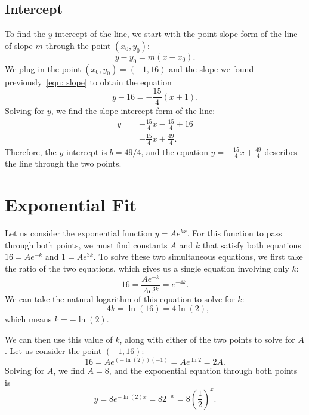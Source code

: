 \documentclass[10pt]{article}         %
\begin{document}
\subsection{Intercept}
\label{sec: intercept}

To find the $y$-intercept of the line, we start with the point-slope form of
the line of slope $m$ through the point $(x_0, y_0)$:
$$
	y - y_0 = m (x - x_0)
	.
$$
We plug in the point $(x_0, y_0) = (-1, 16)$ and the slope we found
previously~\eqref{eqn: slope} to obtain the equation
$$
	y - 16 = - \frac{15}{4} (x + 1)
	.
$$
Solving for $y$, we find the slope-intercept form of the line:
\begin{align*}
	y 
	&= - \frac{15}{4} x - \frac{15}{4} + 16 \\
	&= - \frac{15}{4} x + \frac{49}{4}
	.
\end{align*}
Therefore, the $y$-intercept is $b = 49/4$, and the equation 
$y = - \frac{15}{4} x + \frac{49}{4}$ describes the line through the two
points.

\section{Exponential Fit}
\label{sec: exponential fit}

Let us consider the exponential function $y = A e^{k x}$.  For this function
to pass through both points, we must find constants $A$ and $k$ that satisfy
both equations $16 = A e^{-k}$ and $1 = A e^{3 k}$.  To solve these two
simultaneous equations, we first take the ratio of the two equations, which
gives us a single equation involving only $k$:
$$
	16
	= \frac{A e^{-k}}{A e^{3 k}}
	= e^{-4 k}
	.
$$
We can take the natural logarithm of this equation to solve for $k$:
$$
	-4k = \ln(16) = 4 \ln (2)
	,
$$
which means $k = - \ln(2)$.

We can then use this value of $k$, along with either of the two points to
solve for $A$.  Let us consider the point $(-1, 16)$:
$$
	16 = A e^{(-\ln(2))(-1)} = A e^{\ln{2}} = 2 A
	.
$$
Solving for $A$, we find $A = 8$, and the exponential equation through both
points is
$$
	y
	= 8 e^{-\ln(2) x}
	= 8 2^{-x}
	= 8 \left( \frac{1}{2} \right)^x
	.
$$
\end{document}
